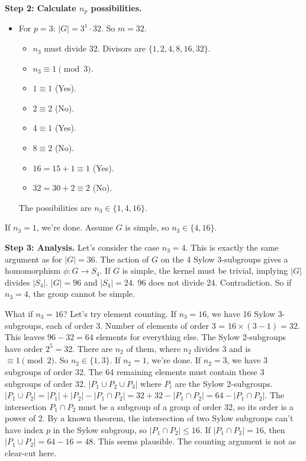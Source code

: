 \documentclass[12pt,a4paper]{article}
\theoremstyle{plain} %
\theoremstyle{definition} %
\theoremstyle{remark} %
\begin{document}
\textbf{Step 2: Calculate $n_p$ possibilities.}
\begin{itemize}
    \item For $p=3$: $|G|=3^1 \cdot 32$. So $m=32$.
        \begin{itemize}
            \item $n_3$ must divide 32. Divisors are $\{1, 2, 4, 8, 16, 32\}$.
            \item $n_3 \equiv 1 \pmod{3}$.
                \item $1 \equiv 1$ (Yes).
                \item $2 \equiv 2$ (No).
                \item $4 \equiv 1$ (Yes).
                \item $8 \equiv 2$ (No).
                \item $16 = 15+1 \equiv 1$ (Yes).
                \item $32 = 30+2 \equiv 2$ (No).
        \end{itemize}
        The possibilities are $n_3 \in \{1, 4, 16\}$.
\end{itemize}
If $n_3=1$, we're done. Assume $G$ is simple, so $n_3 \in \{4, 16\}$.

\textbf{Step 3: Analysis.}
Let's consider the case $n_3=4$. This is exactly the same argument as for $|G|=36$.
The action of $G$ on the 4 Sylow 3-subgroups gives a homomorphism $\phi: G \to S_4$.
If $G$ is simple, the kernel must be trivial, implying $|G|$ divides $|S_4|$.
$|G|=96$ and $|S_4|=24$. 96 does not divide 24. Contradiction.
So if $n_3=4$, the group cannot be simple.

What if $n_3=16$? Let's try element counting.
If $n_3=16$, we have 16 Sylow 3-subgroups, each of order 3.
Number of elements of order 3 = $16 \times (3-1) = 32$.
This leaves $96-32 = 64$ elements for everything else.
The Sylow 2-subgroups have order $2^5=32$.
There are $n_2$ of them, where $n_2$ divides 3 and is $\equiv 1 \pmod 2$. So $n_2 \in \{1, 3\}$.
If $n_2=1$, we're done.
If $n_2=3$, we have 3 subgroups of order 32.
The 64 remaining elements must contain these 3 subgroups of order 32.
$|P_1 \cup P_2 \cup P_3|$ where $P_i$ are the Sylow 2-subgroups.
$|P_1 \cup P_2| = |P_1|+|P_2|-|P_1 \cap P_2| = 32+32-|P_1 \cap P_2| = 64 - |P_1 \cap P_2|$.
The intersection $P_1 \cap P_2$ must be a subgroup of a group of order 32, so its order is a power of 2. By a known theorem, the intersection of two Sylow subgroups can't have index $p$ in the Sylow subgroup, so $|P_1 \cap P_2| \le 16$.
If $|P_1 \cap P_2|=16$, then $|P_1 \cup P_2| = 64-16=48$.
This seems plausible. The counting argument is not as clear-cut here.
\end{document}
